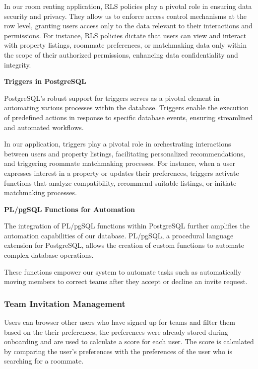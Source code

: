 In our room renting application, RLS policies play a pivotal role in ensuring data security and privacy. They allow us to enforce access control mechanisms at the row level, granting users access only to the data relevant to their interactions and permissions. For instance, RLS policies dictate that users can view and interact with property listings, roommate preferences, or matchmaking data only within the scope of their authorized permissions, enhancing data confidentiality and integrity.

\par\medskip
\noindent\textbf{Triggers in PostgreSQL}
\par\smallskip\noindent PostgreSQL's robust support for triggers serves as a pivotal element in automating various processes within the database. Triggers enable the execution of predefined actions in response to specific database events, ensuring streamlined and automated workflows.

In our application, triggers play a pivotal role in orchestrating interactions between users and property listings, facilitating personalized recommendations, and triggering roommate matchmaking processes. For instance, when a user expresses interest in a property or updates their preferences, triggers activate functions that analyze compatibility, recommend suitable listings, or initiate matchmaking processes.

\par\medskip
\noindent\textbf{PL/pgSQL Functions for Automation}
\par\smallskip\noindent The integration of PL/pgSQL functions within PostgreSQL further amplifies the automation capabilities of our database. PL/pgSQL, a procedural language extension for PostgreSQL, allows the creation of custom functions to automate complex database operations.

These functions empower our system to automate tasks such as automatically moving members to correct teams after they accept or decline an invite request.

\clearpage
\subsubsection{Team Invitation Management}

Users can browser other users who have signed up for teams and filter them based on the their preferences, the preferences were already
stored during onboarding and are used to calculate a score for each user. The score is calculated by comparing the user's preferences with the
preferences of the user who is searching for a roommate.\par

